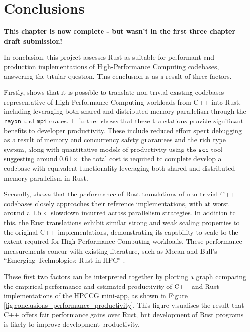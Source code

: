 \chapter{Conclusions}
\label{ch:conclusions}

\textbf{This chapter is now complete - but wasn't in the first three chapter draft submission!}

In conclusion, this project assesses Rust as suitable for performant and production implementations of High-Performance Computing codebases, answering the titular question. This conclusion is as a result of three factors.

Firstly,  shows that it is possible to translate non-trivial existing codebases representative of High-Performance Computing workloads from C++ into Rust, including leveraging both shared and distributed memory parallelism through the \texttt{rayon} and \texttt{mpi} crates. It further shows that these translations provide significant benefits to developer productivity. These include reduced effort spent debugging as a result of memory and concurrency safety guarantees and the rich type system, along with quantitative models of productivity using the \texttt{scc} tool suggesting around $0.61 \times$ the total cost is required to complete develop a codebase with equivalent functionality leveraging both shared and distributed memory parallelism in Rust.

Secondly,  shows that the performance of Rust translations of non-trivial C++ codebases closely approaches their reference implementations, with at worst around a $1.5 \times$ slowdown incurred across parallelism strategies. In addition to this, the Rust translations exhibit similar strong and weak scaling properties to the original C++ implementations, demonstrating its capability to scale to the extent required for High-Performance Computing workloads. These performance measurements concur with existing literature, such as Moran and Bull's ``Emerging Technologies: Rust in HPC'' \cite{moranEmergingTechnologiesRust2023}.

These first two factors can be interpreted together by plotting a graph comparing the empirical performance and estimated productivity of C++ and Rust implementations of the HPCCG mini-app, as shown in Figure \ref{fig:conclusions_performance_productivity}. This figure visualises the result that C++ offers fair performance gains over Rust, but development of Rust programs is likely to improve development productivity.

